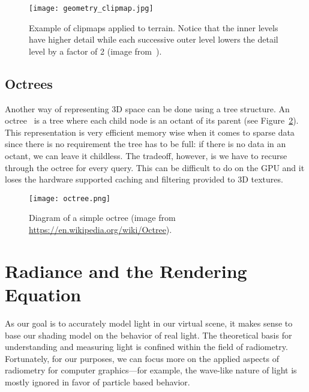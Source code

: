 \begin{figure}[h]
\centering
\texttt{[image: geometry\_clipmap.jpg]}
\caption{Example of clipmaps applied to terrain. Notice that the inner levels have higher detail while each successive outer level lowers the detail level by a factor of 2 (image from~\cite{Losasso:2004:GCT:1015706.1015799}).}
\label{fig:geometryclipmaps}
\end{figure}

\subsection{Octrees}
Another way of representing 3D space can be done using a tree structure. An octree~\cite{MEAGHER1982129} is a tree where each child node is an octant of its parent (see Figure~\ref{fig:octree}). This representation is very efficient memory wise when it comes to sparse data since there is no requirement the tree has to be full: if there is no data in an octant, we can leave it childless. The tradeoff, however, is we have to recurse through the octree for every query. This can be difficult to do on the GPU and it loses the hardware supported caching and filtering provided to 3D textures.

\begin{figure}[h]
\centering
\texttt{[image: octree.png]}
\caption{Diagram of a simple octree (image from \url{https://en.wikipedia.org/wiki/Octree}).}
\label{fig:octree}
\end{figure}

\section{Radiance and the Rendering Equation}
As our goal is to accurately model light in our virtual scene, it makes sense to base our shading model on the behavior of real light. The theoretical basis for understanding and measuring light is confined within the field of radiometry. Fortunately, for our purposes, we can focus more on the applied aspects of radiometry for computer graphics---for example, the wave-like nature of light is mostly ignored in favor of particle based behavior.

